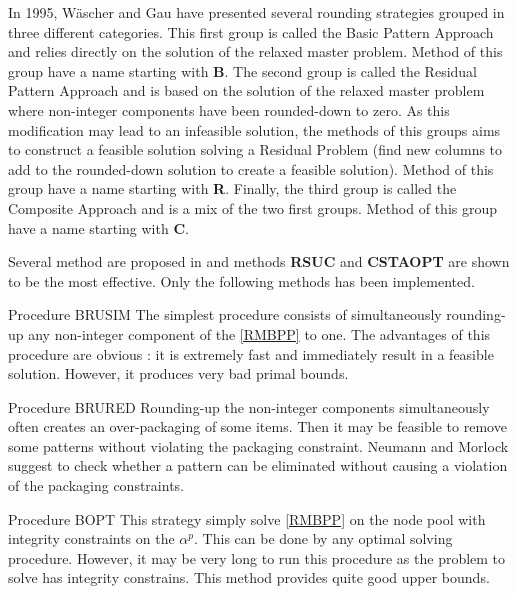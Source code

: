 In 1995, Wäscher and Gau have presented several rounding strategies grouped in three different categories. This first group is called the Basic Pattern Approach and relies directly on the solution of the relaxed master problem. Method of this group have a name starting with \textbf{B}. The second group is called the Residual Pattern Approach and is based on the solution of the relaxed master problem where non-integer components have been rounded-down to zero. As this modification may lead to an infeasible solution, the methods of this groups aims to construct a feasible solution solving a Residual Problem (find new columns to add to the rounded-down solution to create a feasible solution).  Method of this group have a name starting with \textbf{R}. Finally, the third group is called the Composite Approach and is a mix of the two first groups.  Method of this group have a name starting with \textbf{C}.

Several method are proposed in \cite{wascher1996heuristics} and methods \textbf{RSUC} and \textbf{CSTAOPT} are shown to be the most effective. Only the following methods has been implemented.

\begin{paragraph}{Procedure BRUSIM}
	The simplest procedure consists of simultaneously rounding-up any non-integer component of the \eqref{RMBPP} to one. The advantages of this procedure are obvious : it is extremely fast and immediately result in a feasible solution. However, it produces very bad primal bounds.
\end{paragraph}

\begin{paragraph}{Procedure BRURED}
	Rounding-up the non-integer components simultaneously often creates an over-packaging of some items. Then it may be feasible to remove some patterns without violating the packaging constraint. Neumann and Morlock \cite{bankhofer2000quantitative} suggest to check whether a pattern can be eliminated without causing a violation of the packaging constraints. 
\end{paragraph}

\begin{paragraph}{Procedure BOPT}
	This strategy simply solve \eqref{RMBPP} on the node pool with integrity constraints on the $\alpha^p$. This can be done by any optimal solving procedure. However, it may be very long to run this procedure as the problem to solve has integrity constrains. This method provides quite good upper bounds.
\end{paragraph}

